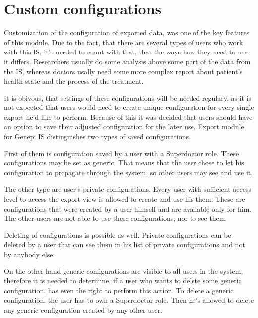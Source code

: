 \documentclass[thesis=B,english]{FITthesis}[2012/10/20]
\begin{document}
\section{Custom configurations}
Customization of the configuration of exported data, was one of the key features of this module. Due to the fact, that there are several types of users who work with this IS, it's needed to count with that, that the ways how they need to use it differs. Researchers usually do some analysis above some part of the data from the IS, whereas doctors usally need some more complex report about patient's health state and the process of the treatment.

It is obivous, that settings of these configurations will be needed regulary, as it is not expected that users would need to create unique configuration for every single export he'd like to perform. Because of this it was decided that users should have an option to save their adjusted configuration for the later use. Export module for Genepi IS distinguishes two types of saved configurations.

First of them is configuration saved by a user with a Superdoctor role. These configurations may be set as generic. That means that the user chose to let his configuration to propagate through the system, so other users may see and use it.

The other type are user's private configurations. Every user with sufficient access level to access the export view is allowed to create and use his them. These are configurations that were created by a user himself and are available only for him. The other users are not able to use these configurations, nor to see them.

Deleting of configurations is possible as well. Private configurations can be deleted by a user that can see them in his list of private configurations and not by anybody else. 

On the other hand generic configurations are visible to all users in the system, therefore it is needed to determine, if a user who wants to delete some generic configuration, has even the right to perform this action. To delete a generic configuration, the user has to own a Superdoctor role. Then he's allowed to delete any generic configuration created by any other user.
\end{document}

